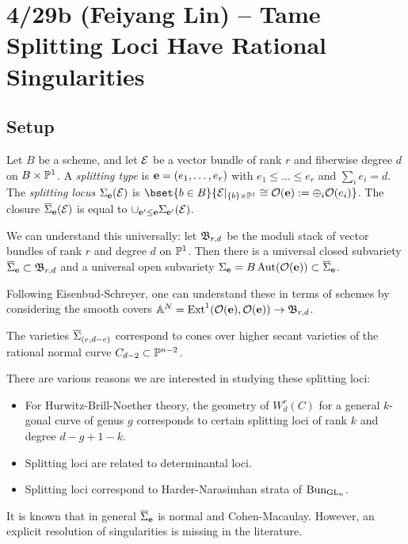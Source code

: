 \documentclass{article}
\begin{document}
\section{4/29b (Feiyang Lin) -- Tame Splitting Loci Have Rational Singularities}

\subsection{Setup}

Let $B$ be a scheme, and let $\mathcal{E}$ be a vector bundle of rank $r$ and fiberwise degree $d$ on $B \times \mathbb{P}^1$.
A \emph{splitting type} is $\mathbf{e} = (e_1, \dots, e_r)$ with $e_1 \leq \dots \leq e_r$ and $\sum_i e_i = d$.
The \emph{splitting locus} $\Sigma_{\mathbf{e}}(\mathcal{E})$ is $\bset{b \in B}{\Ec|_{\{b\} \times \PP^1} \cong \Oc(\ebf) := \oplus_i \Oc(e_i)}$.
The closure $\overline{\Sigma}_{\mathbf{e}}(\mathcal{E})$ is equal to $\cup_{\mathbf{e}' \leq \mathbf{e}} \Sigma_{\mathbf{e}'}(\mathcal{E})$.

We can understand this universally: let $\mathfrak{B}_{r,d}$ be the moduli stack of vector bundles of rank $r$ and degree $d$ on $\mathbb{P}^1$.
Then there is a universal closed subvariety $\overline{\Sigma}_{\mathbf{e}} \subset \mathfrak{B}_{r,d}$ and a universal open subvariety $\Sigma_{\mathbf{e}} = B\operatorname{Aut}(\mathcal{O}(\mathbf{e})) \subset \overline{\Sigma}_{\mathbf{e}}$.

Following Eisenbud-Schreyer, one can understand these in terms of schemes by considering the smooth covers $\mathbb{A}^N = \operatorname{Ext}^1(\mathcal{O}(\mathbf{e}), \mathcal{O}(\mathbf{e})) \to \mathfrak{B}_{r,d}$.

\begin{ex}
	The varieties $\overline{\Sigma}_{(e,d-e)}$ correspond to cones over higher secant varieties of the rational normal curve $C_{d-2} \subset \mathbb{P}^{n-2}$.
\end{ex}

There are various reasons we are interested in studying these splitting loci:
\begin{itemize}
	\item For Hurwitz-Brill-Noether theory, the geometry of $W^r_d(C)$ for a general $k$-gonal curve of genus $g$ corresponds to certain splitting loci of rank $k$ and degree $d - g + 1 - k$.
	\item Splitting loci are related to determinantal loci.
  \item Splitting loci correspond to Harder-Narasimhan strata of $\mathrm{Bun}_{\mathrm{GL}_n}$.
\end{itemize}

It is known that in general $\overline{\Sigma}_{\mathbf{e}}$ is normal and Cohen-Macaulay.
However, an explicit resolution of singularities is missing in the literature.
\end{document}
